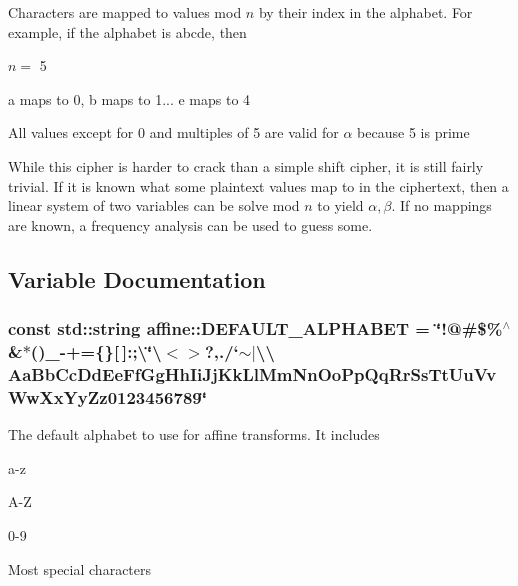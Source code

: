 Characters are mapped to values mod $ n $ by their index in the alphabet. For example, if the alphabet is \textquotesingle{}abcde\textquotesingle{}, then
\begin{DoxyItemize}
\item $ n = $ 5
\item \textquotesingle{}a\textquotesingle{} maps to 0, \textquotesingle{}b\textquotesingle{} maps to 1... \textquotesingle{}e\textquotesingle{} maps to 4
\item All values except for 0 and multiples of 5 are valid for $ \alpha $ because 5 is prime
\end{DoxyItemize}

While this cipher is harder to crack than a simple shift cipher, it is still fairly trivial. If it is known what some plaintext values map to in the ciphertext, then a linear system of two variables can be solve mod $ n $ to yield $ \alpha, \beta $. If no mappings are known, a frequency analysis can be used to guess some. 

\subsection{Variable Documentation}
\subsubsection[{\texorpdfstring{D\+E\+F\+A\+U\+L\+T\+\_\+\+A\+L\+P\+H\+A\+B\+ET}{DEFAULT_ALPHABET}}]{\setlength{\rightskip}{0pt plus 5cm}const std\+::string affine\+::\+D\+E\+F\+A\+U\+L\+T\+\_\+\+A\+L\+P\+H\+A\+B\+ET = \char`\"{}!@\#\$\%$^\wedge$\&$\ast$()\+\_\+-\/+=\{\}\mbox{[}$\,$\mbox{]}\+:;\textbackslash{}\char`\"{}\textbackslash{}\textquotesingle{}$<$$>$?,./`$\sim$$\vert$\textbackslash{}\textbackslash{} Aa\+Bb\+Cc\+Dd\+Ee\+Ff\+Gg\+Hh\+Ii\+Jj\+Kk\+Ll\+Mm\+Nn\+Oo\+Pp\+Qq\+Rr\+Ss\+Tt\+Uu\+Vv\+Ww\+Xx\+Yy\+Zz0123456789\char`\"{}}\hypertarget{namespaceaffine_affbde77969645d73c99952c7f3259b83}{}\label{namespaceaffine_affbde77969645d73c99952c7f3259b83}
The default alphabet to use for affine transforms. It includes
\begin{DoxyItemize}
\item a-\/z
\item A-\/Z
\item 0-\/9
\item Most special characters 
\end{DoxyItemize}